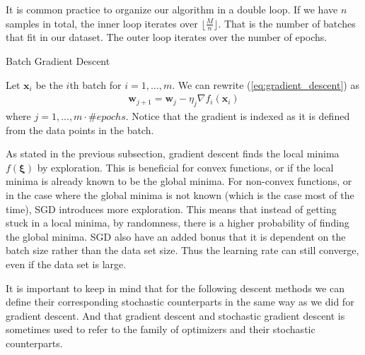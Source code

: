 \documentclass{article}
\theoremstyle{definition}
\begin{document}
It is common practice to organize our algorithm in a double loop. If we have $n$ samples in total, the inner loop iterates over $\lfloor\frac{M}{n} \rfloor$. That is the number of batches that fit in our dataset. The outer loop iterates over the number of epochs.

\newpage

\begin{algorithm}[hbt!]
\caption{Batch Gradient Descent}\label{alg:SGD}
\end{algorithm}
 
Let $\boldsymbol{x}_i$ be the $i$th batch for $i=1, \ldots, m$. We can rewrite (\ref{eq:gradient_descent}) as
\begin{align*}
        \boldsymbol{w}_{j+1} = \boldsymbol{w}_j - \eta_j\nabla f_i (\boldsymbol{x}_i)
\end{align*}
where $j=1,...,m \cdot \#epochs$. Notice that the gradient is indexed as it is defined from the data points in the batch.

As stated in the previous subsection, gradient descent finds the local minima $f(\boldsymbol{\xi})$ by exploration. This is beneficial for convex functions, or if the local minima is already known to be the global minima. For non-convex functions, or in the case where the global minima is not known (which is the case most of the time), SGD introduces more exploration. This means that instead of getting stuck in a local minima, by randomness, there is a higher probability of finding the global minima. SGD also have an added bonus that it is dependent on the batch size rather than the data set size. Thus the learning rate can still converge, even if the data set is large.

It is important to keep in mind that for the following descent methods we can define their corresponding stochastic counterparts in the same way as we did for gradient descent. And that gradient descent and stochastic gradient descent is sometimes used to refer to the family of optimizers and their stochastic counterparts.
\end{document}
